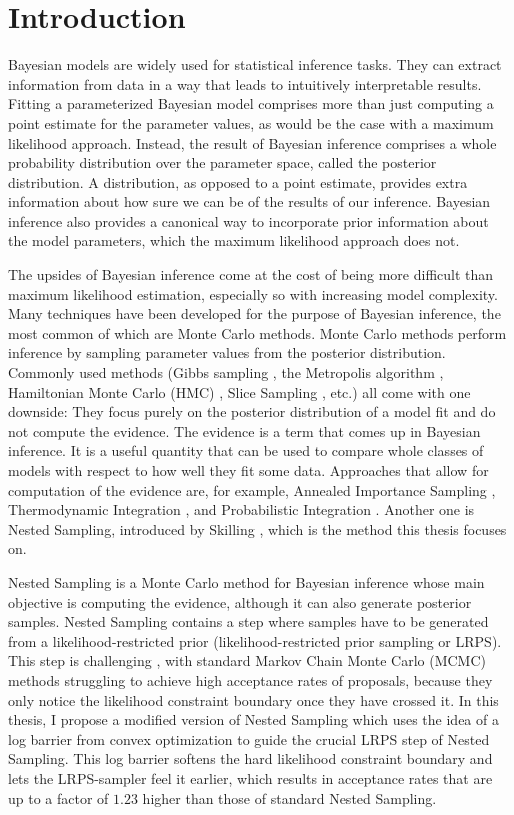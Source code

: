 \documentclass[12pt, a4paper]{report}
\begin{document}
\chapter*{Introduction}
Bayesian models are widely used for statistical inference tasks.
They can extract information from data in a way that leads to intuitively interpretable results.
Fitting a parameterized Bayesian model comprises more than just computing a point estimate for the parameter values, as would be the case with a maximum likelihood approach.
Instead, the result of Bayesian inference comprises a whole probability distribution over the parameter space, called the posterior distribution.
A distribution, as opposed to a point estimate, provides extra information about how sure we can be of the results of our inference.
Bayesian inference also provides a canonical way to incorporate prior information about the model parameters, which the maximum likelihood approach does not.

The upsides of Bayesian inference come at the cost of being more difficult than maximum likelihood estimation, especially so with increasing model complexity.
Many techniques have been developed for the purpose of Bayesian inference, the most common of which are Monte Carlo methods.
Monte Carlo methods perform inference by sampling parameter values from the posterior distribution.
Commonly used methods (Gibbs sampling \cite{gibbs}, the Metropolis algorithm \cite{metropolis}, Hamiltonian Monte Carlo (HMC) \cite{hmc_origin}, Slice Sampling \cite{slice_sampling}, etc.) all come with one downside:
They focus purely on the posterior distribution of a model fit and do not compute the evidence.
The evidence is a term that comes up in Bayesian inference.
It is a useful quantity that can be used to compare whole classes of models with respect to how well they fit some data.
Approaches that allow for computation of the evidence are, for example, Annealed Importance Sampling \cite{annealed_importance_sampling}, Thermodynamic Integration \cite{thermodynamic_integration}, and Probabilistic Integration \cite{bayesian_cubature}.
Another one is Nested Sampling, introduced by Skilling \cite{skilling}, which is the method this thesis focuses on.

Nested Sampling is a Monte Carlo method for Bayesian inference whose main objective is computing the evidence, although it can also generate posterior samples.
Nested Sampling contains a step where samples have to be generated from a likelihood-restricted prior (likelihood-restricted prior sampling or LRPS).
This step is challenging \cite[9]{hmc_in_ns}, with standard Markov Chain Monte Carlo (MCMC) methods struggling to achieve high acceptance rates of proposals, because they only notice the likelihood constraint boundary once they have crossed it.
In this thesis, I propose a modified version of Nested Sampling which uses the idea of a log barrier from convex optimization to guide the crucial LRPS step of Nested Sampling.
This log barrier softens the hard likelihood constraint boundary and lets the LRPS-sampler feel it earlier, which results in acceptance rates that are up to a factor of $1.23$ higher than those of standard Nested Sampling.
\end{document}
